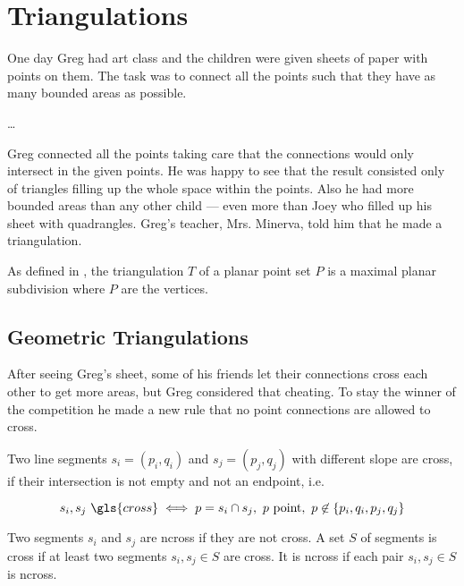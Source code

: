 \chapter{Triangulations}\label{cha:triangulations}
One day Greg had art class and the children were given sheets of
paper with points on them. The task was to connect all the points 
such that they have as many bounded areas as possible. 

\begin{definition}
  \ldots{}
\end{definition}

Greg 
connected all the points taking care that the connections would only 
intersect in the given points. He was happy to see that the result 
consisted only of triangles filling up the whole space within the 
points. Also he had more bounded areas than any other child --- 
even more than Joey who filled up his sheet with quadrangles. Greg's
teacher, Mrs. Minerva, told him that he made a triangulation.

\begin{definition}[Triangulation]\label{def:triangulation_subdivision}
As defined in \cite[Section 9.1]{deberg_compgeom}, the
triangulation \(T\) of a planar point set \(P\) is a maximal planar 
subdivision where \(P\) are the vertices.
\end{definition}

\section{Geometric Triangulations}
After seeing Greg's sheet, some of his friends let their connections
cross each other to get more areas, but Greg considered that
cheating. To stay the winner of the competition he made a new rule
that no point connections are allowed to cross.

\begin{definition}[Crossing]\label{def:crossing}
Two line segments \(s_i=(p_i,q_i)\) and \(s_j=(p_j,q_j)\) with 
different slope are \gls{cross}, if their intersection is not empty
and not an endpoint, i.e.

\[
  s_i, s_j~\gls{cross}
  \iff
  p = s_i\cap s_j,~
  p~\text{point},~
  p \not\in \{p_i,q_i,p_j,q_j\} \]

Two segments \(s_i\) and \(s_j\) are \gls{ncross} if they are
not \gls{cross}. A set \(S\) of segments is \gls{cross} if at least
two segments \(s_i, s_j \in S\) are \gls{cross}. It is \gls{ncross}
if each pair \(s_i, s_j \in S\) is \gls{ncross}.
\end{definition}

